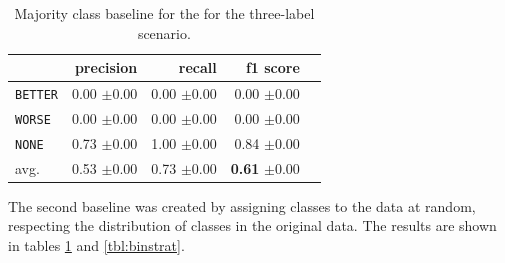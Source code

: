\begin{table}[!htb]
\begin{minipage}{.5\linewidth}
	\end{minipage}%
	\begin{minipage}{.5\linewidth}
		\centering
		\caption{Majority class baseline for the  for the three-label scenario.}
		\label{tbl:3majoritybaseline}
		\begin{tabularx}{0.97\linewidth}{Xrrrr}
			\toprule
			                & precision                    & recall                       & f1 score                                    \\ \midrule 
			\texttt{BETTER} & 0.00 \scriptsize{$\pm$0.00} & 0.00 \scriptsize{$\pm$0.00} & 0.00 \scriptsize{$\pm$0.00}                \\ 
			\texttt{WORSE}  & 0.00 \scriptsize{$\pm$0.00} & 0.00 \scriptsize{$\pm$0.00} & 0.00 \scriptsize{$\pm$0.00}                \\ 
			\texttt{NONE}   & 0.73 \scriptsize{$\pm$0.00}     & 1.00 \scriptsize{$\pm$0.00} & 0.84 \scriptsize{$\pm$0.00}                \\ 
			avg.         & 0.53 \scriptsize{$\pm$0.00} & 0.73 \scriptsize{$\pm$0.00} & \textbf{0.61} \scriptsize{$\pm$0.00} \\ 
			\bottomrule
		\end{tabularx}
	\end{minipage} 
\end{table}


The second baseline was created by assigning classes to the data at random, respecting the distribution of classes in the original data. The results are shown in tables \ref{tbl:3majoritybaseline} and \ref{tbl:binstrat}.



